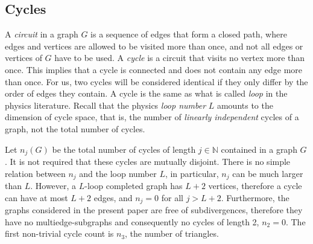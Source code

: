 \documentclass[12pt]{article}
\numberwithin{equation}{section}
\begin{document}
\subsection{Cycles}\label{sec:cycles}




A \emph{circuit} in a graph $G$ is a sequence of edges that form a closed path, where edges and vertices are allowed to be visited more than once, and not all edges or vertices of $G$ have to be used.
A \emph{cycle} is a circuit that visits no vertex more than once. This implies that a cycle is connected and does not contain any edge more than once. For us, two cycles will be considered identical if they only differ by the order of edges they contain. A cycle is the same as what is called \emph{loop} in the physics literature. Recall that the physics   \emph{loop number} $L$ amounts to the dimension of cycle space, that is, the number of \emph{linearly independent} cycles of a graph, not the total number of cycles. 

Let $n_j(G)$ be the total number of cycles of length $j\in \mathbb N$ contained in a graph $G$.   It is not required that these cycles are mutually disjoint.  There is no simple relation between $n_j$ and the loop number $L$, in particular,     $n_j$ can be much larger than  $L$. However, a $L$-loop completed graph has $L+2$ vertices, therefore a cycle can have at most $L+2$ edges, and $n_j=0$ for all $j>L+2$. Furthermore, the graphs considered in the present paper are free of subdivergences, therefore they have no multiedge-subgraphs and consequently no cycles of length 2, $n_2=0$. The first non-trivial cycle count is $n_3$, the number of triangles. 
\end{document}
